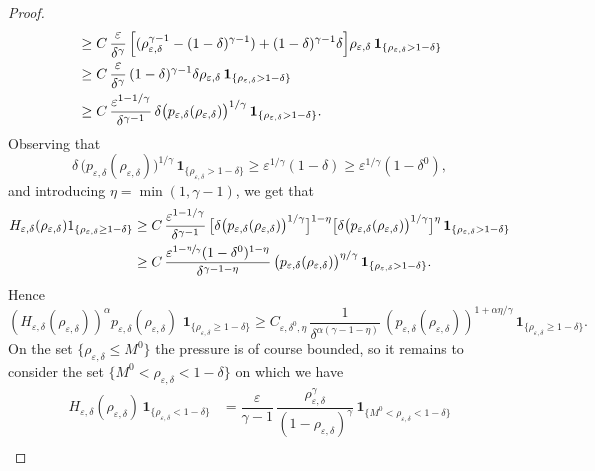 \documentclass[JEP,XML,SOM,Unicode,NoEqCountersInSection]{cedram}
\newcommand{\<}{\bigl\langle}
\renewcommand{\>}{\bigr\rangle}
\theoremstyle{definition}
\theoremstyle{remark}
\let\ep\varepsilon
\begin{document}
\begin{proof}
\begin{align*}
& \geq C \,\dfrac{\ep}{\delta^\gamma}\, \Bigl[
(\rho_{\varepsilon,\delta}^{\gamma-1} - (1-\delta)^{\gamma-1})
+ (1-\delta)^{\gamma-1}\delta \Bigr] \rho_{\ep,\delta}
\,\mathbf{1}_{\{ \rho_{\ep,\delta} > 1-\delta \}}\\
& \geq C \,\dfrac{\ep}{\delta^\gamma}\, (1-\delta)^{\gamma-1}\delta \rho_{\ep,\delta}
\,\mathbf{1}_{\{ \rho_{\ep,\delta} > 1-\delta \}}\\
& \geq C\,\frac{\varepsilon^{1-1/\gamma}}{\delta^{\gamma-1}}\,\delta \big(p_{\varepsilon,\delta}(\rho_{\varepsilon,\delta})\big)^{1/\gamma}\,\mathbf{1}_{\{ \rho_{\ep,\delta} > 1-\delta \}}.
\end{align*}
Observing that
\[
\delta \, \big(p_{\varepsilon,\delta}(\rho_{\varepsilon,\delta})\big)^{1/\gamma}\,\mathbf{1}_{\{ \rho_{\ep,\delta} > 1-\delta \}}
\ge \varepsilon^{1/\gamma}(1-\delta)
\ge \varepsilon^{1/\gamma}(1-\delta^0),
\]
and introducing $\eta = \min(1,\gamma-1)$, we get that
\begin{align*}
H_{\varepsilon,\delta}(\rho_{\varepsilon,\delta}) 1_{\{\rho_{\varepsilon,\delta} \geq 1-\delta\}}
& \geq C \,\frac{\varepsilon^{1-1/\gamma}}{\delta^{\gamma-1}}\,
\big[\delta \big(p_{\varepsilon,\delta}(\rho_{\varepsilon,\delta})\big)^{1/\gamma}\big]^{1-\eta}
\big[\delta \big(p_{\varepsilon,\delta}(\rho_{\varepsilon,\delta})\big)^{1/\gamma}\big]^{\eta}
\,\mathbf{1}_{\{ \rho_{\ep,\delta} > 1-\delta \}} \\
& \geq C\, \frac{\varepsilon^{1-\sfrac{\eta}{\gamma}}(1-\delta^0)^{1-\eta}}{\delta^{\gamma-1-\eta}}\, \big(p_{\varepsilon,\delta}(\rho_{\varepsilon,\delta})\big)^{\eta/\gamma}
\,\mathbf{1}_{\{ \rho_{\ep,\delta} > 1-\delta \}}.
\end{align*}
Hence
\[
(H_{\varepsilon,\delta}(\rho_{\varepsilon, \delta}))^{\alpha}
p_{\varepsilon,\delta}(\rho_{\varepsilon,\delta})\,
\,\mathbf{1}_{\{\rho_{\varepsilon,\delta} \ge 1-\delta\} }
\ge C_{\varepsilon,\delta^0,\eta}\, \frac{1}{\delta^{\alpha(\gamma-1-\eta)}}\,
(p_{\varepsilon,\delta}(\rho_{\varepsilon,\delta}))^{1+\alpha\eta/\gamma}
\,\mathbf{1}_{\{\rho_{\varepsilon,\delta} \ge 1-\delta\} }.
\]
On the set $\{\rho_{\ep,\delta} \leq M^0\}$ the pressure is of course bounded, so it remains to consider the set $\{M^0 < \rho_{\varepsilon,\delta} < 1-\delta\}$ on which we have
\begin{align*}
H_{\varepsilon,\delta}(\rho_{\varepsilon, \delta})\,\mathbf{1}_{\{\rho_{\varepsilon,\delta} < 1-\delta\}}
& = \dfrac{\ep}{\gamma-1}\, \dfrac{\rho_{\ep,\delta}^\gamma}{(1-\rho_{\ep,\delta})^{\gamma}}\,\mathbf{1}_{\{M^0 < \rho_{\varepsilon,\delta} < 1-\delta\}} \\

\end{align*}
\end{proof}
\end{document}
